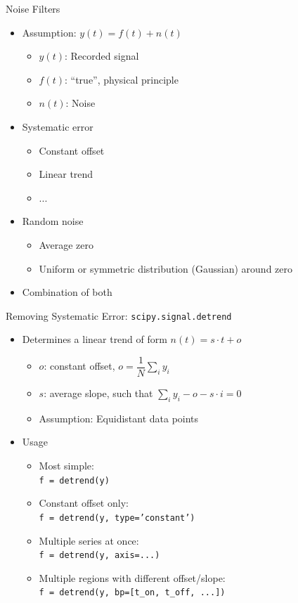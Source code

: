 
\begin{frame}{Noise Filters}
%
\begin{itemize}
\item Assumption: $y(t) = f(t) + n(t)$
	\begin{itemize}
	\item $y(t)$: Recorded signal
	\item $f(t)$: \enquote{true}, physical principle
	\item $n(t)$: Noise
	\end{itemize}
\item Systematic error
	\begin{itemize}
	\item Constant offset
	\item Linear trend
	\item ...
	\end{itemize}
\item Random noise
	\begin{itemize}
	\item Average zero
	\item Uniform or symmetric distribution (\zB Gaussian) around zero
	\end{itemize}
\item Combination of both
\end{itemize}
%
\end{frame}


\begin{frame}{Removing Systematic Error: \texttt{scipy.signal.detrend}}
%
\begin{itemize}
\item Determines a linear trend of form $n(t) = s \cdot t + o$
	\begin{itemize}
	\item $o$: constant offset, $o = \dfrac{1}{N} \sum_i y_i$
	\item $s$: average slope, such that $\sum_i y_i - o - s \cdot i = 0$
	\item[\Thus] Assumption: Equidistant data points
	\end{itemize}
\item Usage
	\begin{itemize}
	\item Most simple: \\
		\texttt{f = detrend(y)}
	\item Constant offset only: \\
		\texttt{f = detrend(y, type='constant')}
	\item Multiple series at once: \\
		\texttt{f = detrend(y, axis=...)}
	\item Multiple regions with different offset/slope: \\
		\texttt{f = detrend(y, bp=[t\_on, t\_off, ...])}
	\end{itemize}
\end{itemize}
%
\end{frame}

